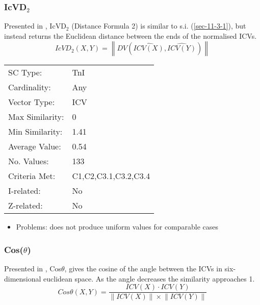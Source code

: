 \documentclass{article}
\begin{document}
\subsubsection{IcVD$_{2}$}
\label{sec-11-4-2}

Presented in \citet{Rogers1992}, IcVD$_{2}$ (Distance Formula 2) is
similar to s.i. (\ref{sec-11-3-1}), but instead returns the Euclidean distance
between the ends of the normalised ICVs.
$$IcVD_{2}(X,Y)=\left\|DV(\hat{ICV(X)},\hat{ICV(Y)})\right\|$$

\begin{center}
\begin{tabular}{ll}
 SC Type:         &  TnI                   \\
 Cardinality:     &  Any                   \\
 Vector Type:     &  ICV                   \\
 Max Similarity:  &  0                     \\
 Min Similarity:  &  1.41                  \\
 Average Value:   &  0.54                  \\
 No. Values:      &  133                   \\
 Criteria Met:    &  C1,C2,C3.1,C3.2,C3.4  \\
 I-related:       &  No                    \\
 Z-related:       &  No                    \\
\end{tabular}
\end{center}


\begin{itemize}
\item Problems: does not produce uniform values for comparable cases
\end{itemize}
\subsubsection{Cos($\theta$)}
\label{sec-11-4-3}

Presented in \citet{Rogers1992}, Cos$\theta$, gives the cosine of the
angle between the ICVs in six-dimensional euclidean space. As the
angle decreases the similarity approaches 1.
$$Cos\theta(X,Y)=\frac{ICV(X)\cdot ICV(Y)}{\left\|ICV(X)\right\|\times\left\|ICV(Y)\right\|}$$
\end{document}

